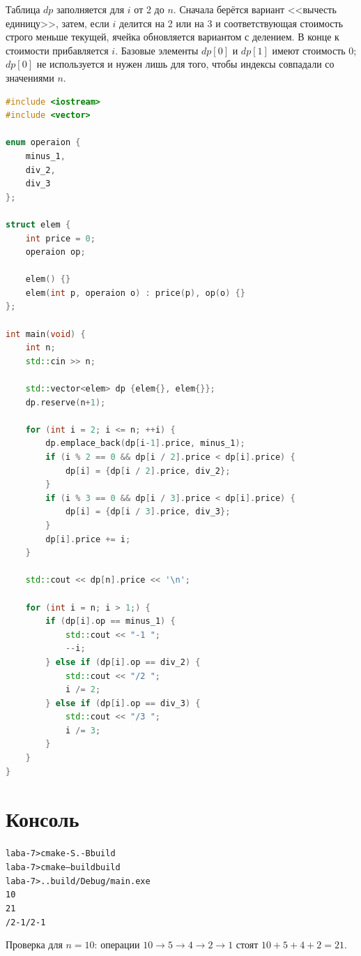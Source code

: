 Таблица $dp$ заполняется для $i$ от 2 до $n$. Сначала берётся вариант <<вычесть единицу>>, затем, если $i$ делится на 2 или на 3 и соответствующая стоимость строго меньше текущей, ячейка обновляется вариантом с делением. В конце к стоимости прибавляется $i$. Базовые элементы $dp[0]$ и $dp[1]$ имеют стоимость 0; $dp[0]$ не используется и нужен лишь для того, чтобы индексы совпадали со значениями $n$.

\begin{lstlisting}[language=C++]
#include <iostream>
#include <vector>

enum operaion {
    minus_1,
    div_2,
    div_3
};

struct elem {
    int price = 0;
    operaion op;

    elem() {}
    elem(int p, operaion o) : price(p), op(o) {}
};

int main(void) {
    int n;
    std::cin >> n;

    std::vector<elem> dp {elem{}, elem{}};
    dp.reserve(n+1);

    for (int i = 2; i <= n; ++i) {
        dp.emplace_back(dp[i-1].price, minus_1);
        if (i % 2 == 0 && dp[i / 2].price < dp[i].price) {
            dp[i] = {dp[i / 2].price, div_2};
        }
        if (i % 3 == 0 && dp[i / 3].price < dp[i].price) {
            dp[i] = {dp[i / 3].price, div_3};
        }
        dp[i].price += i;
    }

    std::cout << dp[n].price << '\n';

    for (int i = n; i > 1;) {
        if (dp[i].op == minus_1) {
            std::cout << "-1 ";
            --i;
        } else if (dp[i].op == div_2) {
            std::cout << "/2 ";
            i /= 2;
        } else if (dp[i].op == div_3) {
            std::cout << "/3 ";
            i /= 3;
        }
    }
}
\end{lstlisting}

\section{Консоль}
\begin{alltt}
laba-7> cmake -S . -B build
laba-7> cmake --build build
laba-7> ..build/Debug/main.exe
10
21
/2 -1 /2 -1
\end{alltt}

Проверка для $n = 10$: операции $10 \to 5 \to 4 \to 2 \to 1$ стоят $10 + 5 + 4 + 2 = 21$.
\pagebreak
